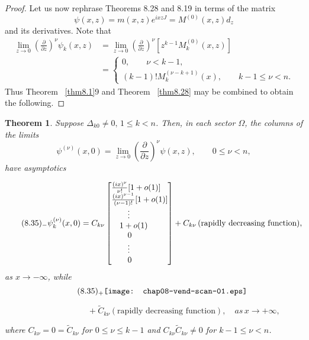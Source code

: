 \documentclass{surv-l}
\theoremstyle{plain}
\newtheorem{theorem}{Theorem}[section]
\theoremstyle{definition}
\numberwithin{equation}{chapter}
\begin{document}
\begin{proof}
Let us now rephrase Theorems 8.28 and 8.19 in terms of the matrix
\begin{equation*}
\psi(x, z)=m(x, z)e^{ixzJ}=M^{(0)}(x,z)d_{z}
\end{equation*}
and its derivatives. Note that
\begin{align*}
\lim_{z\rightarrow 0}\left(\frac{\partial}{\partial z}\right)^{\nu}\psi_{k}(x, z)&=\lim_{z\rightarrow 0}\left(\frac{\partial}{\partial z}\right)^{\nu} [z^{k-1}M_{k}^{(0)}(x, z)]\\
&=\left\{\begin{array}{ll}
0, \qquad \nu < k - 1,\\
(k -1)!M_{k}^{(\nu-k+1)}(x),\qquad k -1 \leq \nu < n.
\end{array}\right.
\end{align*}
Thus Theorem ~\ref{thm8.1}9 and Theorem ~\ref{thm8.28} may be combined to obtain the following.
\end{proof}
\setcounter{theorem}{33}
\begin{theorem}\label{thm8.34} Suppose $\Delta_{k0}\neq 0,\,1\leq k < n$. Then, in each sector $\Omega$, the
columns of the limits
\begin{equation*}
\psi^{(\nu)}(x,0) = \lim_{z\rightarrow 0}\left(\frac{\partial}{\partial z}\right)^{\nu} \psi(x,z),\qquad 0 \leq \nu < n,
\end{equation*}
have asymptotics

\begin{align*}
\tag*{$(8.35)_{-}$} \psi_{k}^{(\nu)}(x, 0)= C_{k\nu} \left[\begin{array}{@{}l@{}}
\frac{(ix)^{\nu}}{\nu!}[1+o(1)]\\
\frac{(ix)^{\nu- 1}}{(\nu-1)!}[1 + o(1)]\\
\qquad\vdots\\
\quad 1 + o(1)\\
\qquad 0\\
\qquad\vdots\\
\qquad 0
\end{array}\right] +C_{k\nu}\, (\text{rapidly decreasing function}),
\end{align*}
as $x \rightarrow-\infty$, while
\begin{equation*}
\tag*{$(8.35)_{+}$}
\texttt{[image: chap08-vend-scan-01.eps]}
\end{equation*}

$\qquad\qquad\qquad\qquad\qquad+\tilde{C}_{k\nu} (\text{rapidly decreasing function}),\quad as\, x\rightarrow +\infty,$

where $C_{k\nu}=0=\tilde{C}_{k\nu}$ for $ 0\leq\nu \leq k-1$ and $C_{k\nu}\tilde{C}_{k\nu}\neq 0$ for $k-1 \leq\nu <n$.
\end{theorem}
\end{document}
